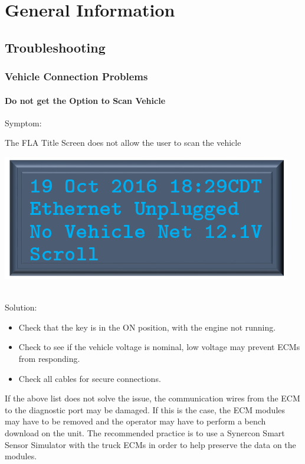 \documentclass[11pt, oneside]{book}
\begin{document}
\part{General Information}


\chapter{Troubleshooting}

\section{Vehicle Connection Problems}
\subsection{Do not get the Option to Scan Vehicle}
Symptom:\\
\noindent\begin{minipage}{0.45\textwidth}%
The FLA Title Screen does not allow the user to scan the vehicle
\end{minipage}%
\hfill%
\begin{minipage}{0.45\textwidth}
\includegraphics[width=\linewidth]{../media/pstricks_files/01_main_screen_no_connections}
\end{minipage}\\
Solution:\\
\begin{itemize}
\item Check that the key is in the ON position, with the engine not running.
\item Check to see if the vehicle voltage is nominal, low voltage may prevent ECMs from responding.
\item Check all cables for secure connections.
\end{itemize}
If the above list does not solve the issue, the communication wires from the ECM to the diagnostic port may be damaged. If this is the case, the ECM modules may have to be removed and the operator may have to perform a bench download on the unit. The recommended practice is to use a Synercon Smart Sensor Simulator with the truck ECMs in order to help preserve the data on the modules.
\end{document}
